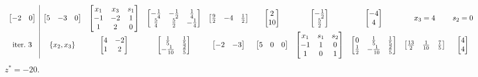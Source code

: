 \begin{equation*}
{\begin{array}{ c|c c c c c c c c c c c c c }
\begin{bmatrix}
-2 & 0
\end{bmatrix} & \begin{bmatrix}
5 & -3 & 0
\end{bmatrix} & \begin{bmatrix}
x_{1} & x_{3} & s_{1}\\
-1 & -2 & 1\\
1 & 2 & 0
\end{bmatrix} & \begin{bmatrix}
-\frac{1}{4} & -\frac{1}{2} & \frac{1}{4}\\
\frac{5}{4} & \frac{5}{2} & -\frac{1}{4}
\end{bmatrix} & \begin{bmatrix}
\frac{9}{2} & -4 & \frac{1}{2}
\end{bmatrix} & \begin{bmatrix}
2\\
10
\end{bmatrix} & \begin{bmatrix}
-\frac{1}{2}\\
\frac{5}{2}
\end{bmatrix} & \begin{bmatrix}
-4\\
4
\end{bmatrix} & x_{3} =4 & s_{2} =0\\
\text{iter.} \ 3 & \{x_{2} ,x_{3}\} & \begin{bmatrix}
4 & -2\\
1 & 2
\end{bmatrix} & \begin{bmatrix}
\frac{1}{5} & \frac{1}{5}\\
-\frac{1}{10} & \frac{2}{5}
\end{bmatrix} & \begin{bmatrix}
-2 & -3
\end{bmatrix} & \begin{bmatrix}
5 & 0 & 0
\end{bmatrix} & \begin{bmatrix}
x_{1} & s_{1} & s_{2}\\
-1 & 1 & 0\\
1 & 0 & 1
\end{bmatrix} & \begin{bmatrix}
0 & \frac{1}{5} & \frac{1}{5}\\
\frac{1}{2} & -\frac{1}{10} & \frac{2}{5}
\end{bmatrix} & \begin{bmatrix}
\frac{13}{2} & \frac{1}{10} & \frac{7}{5}
\end{bmatrix} & \begin{bmatrix}
4\\
4
\end{bmatrix} &  &  &  & 
\end{array}
}
\end{equation*}
$z^{*} =-20$.

